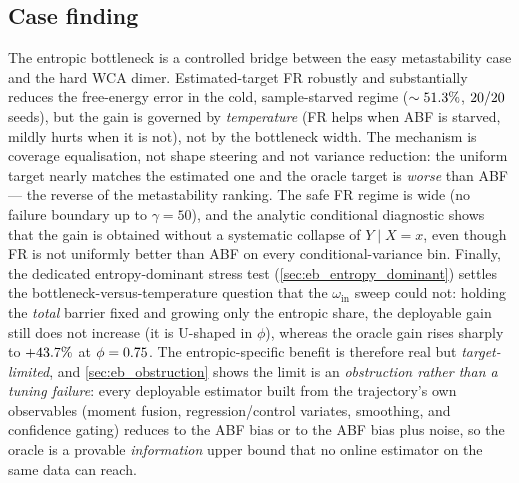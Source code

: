 \subsection{Case finding}
The entropic bottleneck is a controlled bridge between the easy metastability case
and the hard WCA dimer. Estimated-target FR robustly and substantially reduces the
free-energy error in the cold, sample-starved regime ($\sim51.3\%$,
$20/20$ seeds), but the gain is governed by \emph{temperature} (FR helps
when ABF is starved, mildly hurts when it is not), not by the bottleneck width.
The mechanism is coverage equalisation, not shape steering and not variance
reduction: the uniform target nearly matches the estimated one and the oracle target is
\emph{worse} than ABF --- the reverse of the metastability ranking. The safe FR
regime is wide (no failure boundary up to $\gamma=50$), and the analytic
conditional diagnostic shows that the gain is obtained without a systematic
collapse of $Y\mid X=x$, even though FR is not uniformly better than ABF on every
conditional-variance bin. Finally, the dedicated entropy-dominant stress test
(\cref{sec:eb_entropy_dominant}) settles the bottleneck-versus-temperature
question that the $\omega_{\mathrm{in}}$ sweep could not: holding the \emph{total}
barrier fixed and growing only the entropic share, the deployable gain still does
not increase (it is U-shaped in $\phi$), whereas the oracle gain rises sharply to
$+43.7\%$ at $\phi=0.75$. The entropic-specific benefit is
therefore real but \emph{target-limited}, and \cref{sec:eb_obstruction} shows the
limit is an \emph{obstruction rather than a tuning failure}: every deployable
estimator built from the trajectory's own observables (moment fusion,
regression/control variates, smoothing, and confidence gating) reduces to the ABF
bias or to the ABF bias plus noise, so the oracle is a provable
\emph{information} upper bound that no online estimator on the same data can
reach.
